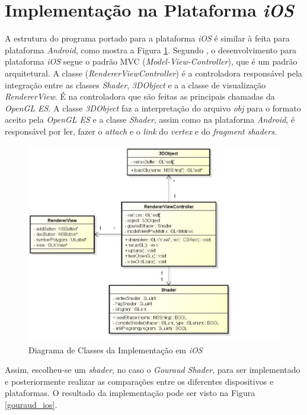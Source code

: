 \section{Implementação na Plataforma \textit{iOS}} 

	A estrutura do programa portado para a plataforma \textit{iOS} é similar à feita para plataforma \textit{Android}, como mostra a Figura \ref{ios_diag}. Segundo \cite{neub2013}, o desenvolvimento para plataforma \textit{iOS} segue o padrão MVC (\textit{Model-View-Controller}), que é um padrão arquitetural. A classe (\textit{RendererViewController}) é a controladora responsável pela integração entre as classes \textit{Shader}, \textit{3DObject} e a a classe de visualização \textit{RendererView}. É na controladora que são feitas as principais chamadas da \textit{OpenGL ES}. A classe \textit{3DObject} faz a interpretação do arquivo \textit{obj} para o formato aceito pela \textit{OpenGL ES} e a classe \textit{Shader}, assim como na plataforma \textit{Android}, é responsável por ler, fazer o \textit{attach} e o \textit{link} do \textit{ vertex} e do \textit{fragment shaders}. 

	\begin{figure}[ht]
	\centering
		\includegraphics[keepaspectratio=true,scale=0.6]{figuras/ios_class_diagram.jpg}
	\caption{Diagrama de Classes da Implementação em \textit{iOS}}
	\label{ios_diag}
	\end{figure}

	Assim, escolheu-se um \textit{shader}, no caso o \textit{Gouraud Shader}, para ser implementado e posteriormente realizar as comparações entre os diferentes dispositivos e plataformas. O resultado da implementação pode ser visto na Figura \ref{gouraud_ios}.

